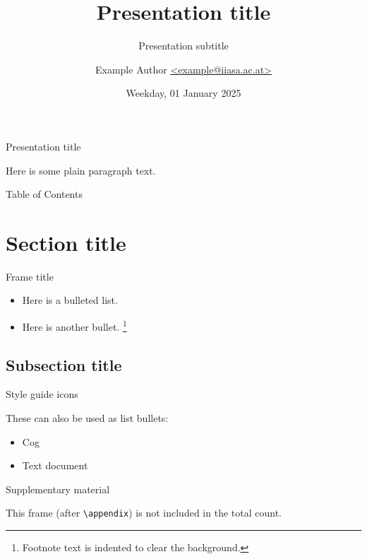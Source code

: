 \documentclass[aspectratio=169]{beamer}
\title{Presentation title}
\subtitle{Presentation subtitle}
\author{Example Author
  \href{mailto:example@iiasa.ac.at}%
  {\ttfamily <example@iiasa.ac.at>}}
\date{Weekday, 01 January 2025}
\institute{Venue for presentation}
\begin{document}
\maketitle

\begin{frame}{Presentation title}

  Here is some plain paragraph text.

\end{frame}

\begin{frame}{Table of Contents}

  \tableofcontents

\end{frame}

\section{Section title}

\begin{frame}{Frame title}

  \begin{itemize}
    \item Here is a bulleted list.
    \item Here is another bullet.%
          \footnote{Footnote text is indented to clear the background.}
  \end{itemize}

\end{frame}

\subsection{Subsection title}

\begin{frame}{Style guide icons}


  These can also be used as list bullets:

  \begin{itemize}
    \item [\iiasaicon{cog}] Cog
    \item [\iiasaicon{doc-text}] Text document
  \end{itemize}

\end{frame}

\makefinalslide

\appendix

\begin{frame}{Supplementary material}

  This frame (after \texttt{\textbackslash{}appendix}) is not included in the total count.

\end{frame}
\end{document}
